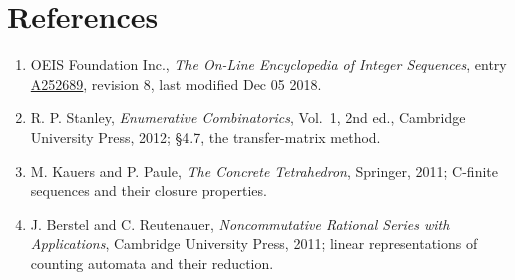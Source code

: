\documentclass[11pt]{article}
\theoremstyle{definition}
\begin{document}
\section{References}

\begin{enumerate}

\item OEIS Foundation Inc., \emph{The On-Line Encyclopedia of Integer Sequences}, entry \href{https://oeis.org/A252689}{A252689}, revision 8, last modified Dec 05 2018.

\item R. P. Stanley, \emph{Enumerative Combinatorics}, Vol.~1, 2nd ed., Cambridge University Press, 2012; \S4.7, the transfer-matrix method.

\item M. Kauers and P. Paule, \emph{The Concrete Tetrahedron}, Springer, 2011; C-finite sequences and their closure properties.

\item J. Berstel and C. Reutenauer, \emph{Noncommutative Rational Series with Applications}, Cambridge University Press, 2011; linear representations of counting automata and their reduction.

\end{enumerate}
\end{document}
